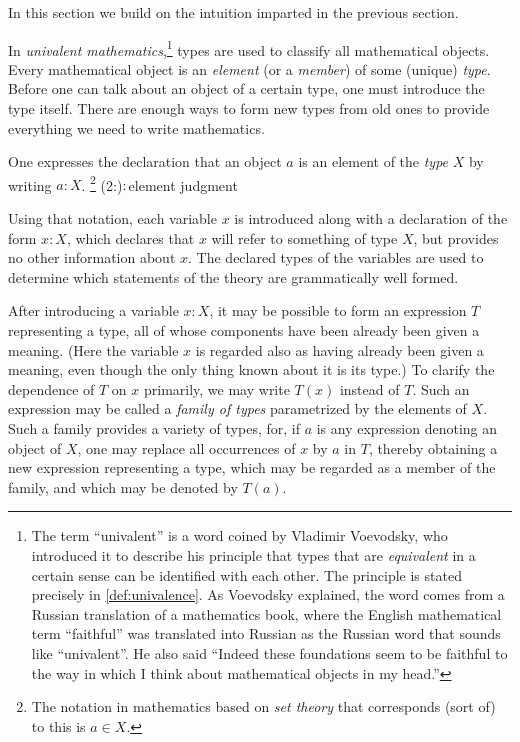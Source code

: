 In this section we build on the intuition imparted in the previous section.

In \emph{univalent mathematics},\footnote{The term ``univalent'' is a word coined by Vladimir Voevodsky, who
introduced it to describe his principle that types that are \emph{equivalent} in a certain sense can be identified with each other.  The
principle is stated precisely in \cref{def:univalence}.  As Voevodsky explained, the word comes from a Russian translation of a mathematics
book, where the English mathematical term ``faithful'' was translated into Russian as the Russian word that sounds like ``univalent''.  He also
said ``Indeed these foundations seem to be faithful to the way in which I think about mathematical objects in my head.''} types are used to
classify all mathematical objects.  Every mathematical object is an \emph{element} (or a \emph{member}) of some (unique) \emph{type}.  Before
one can talk about an object of a certain type, one must introduce the type itself.  There are enough ways to form new types from old ones to
provide everything we need to write mathematics.

One expresses the declaration that an object $a$ is an element of the \emph{type} $X$ by writing $a:X$.%
\footnote{The notation in mathematics based on \emph{set theory} that corresponds (sort of) to this is $a \in X$.}
\glossary(2:){${:}$}{element judgment}

Using that notation, each variable $x$ is introduced along with a declaration of the form $x:X$, which declares that $x$ will refer to something
of type $X$, but provides no other information about $x$.  The declared types of the variables are used to determine which statements of the
theory are grammatically well formed.

After introducing a variable $x:X$, it may be possible to form an expression $T$ representing a type, all of whose components have
been already been given a meaning.
(Here the variable $x$ is regarded also as having already been given a meaning, even though the only thing known about it is its type.)
To clarify the dependence of $T$ on $x$ primarily, we may write $T(x)$ instead of $T$.
Such an expression may be called a \emph{family of types}  parametrized by the elements of $X$.
Such a family provides a variety of types, for, if $a$ is any expression denoting an object of $X$, one may replace all
occurrences of $x$ by $a$ in $T$, thereby obtaining a new expression representing a type, which may be regarded as a member of the family,
and which may be denoted by $T(a)$.

